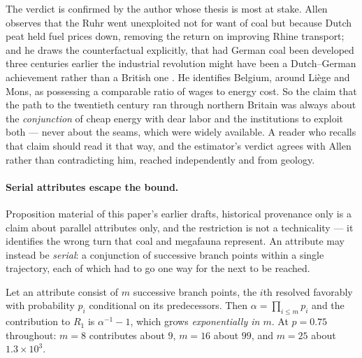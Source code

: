 The verdict is confirmed by the author whose thesis is most at stake.
Allen observes that the Ruhr went unexploited not for want of coal but
because Dutch peat held fuel prices down, removing the return on
improving Rhine transport; and he draws the counterfactual explicitly,
that had German coal been developed three centuries earlier the
industrial revolution might have been a Dutch--German achievement rather
than a British one \cite{Allen09}. He identifies Belgium, around
Li\`ege and Mons, as possessing a comparable ratio of wages to energy
cost. So the claim that the path to the twentieth century ran through
northern Britain was always about the \emph{conjunction} of cheap energy
with dear labor and the institutions to exploit both --- never about
the seams, which were widely available. A reader who recalls that claim
should read it that way, and the estimator's verdict agrees with Allen
rather than contradicting him, reached independently and from geology.


\paragraph{Serial attributes escape the bound.} Proposition
material of this paper's earlier drafts, historical provenance only is a claim about parallel attributes only, and the
restriction is not a technicality --- it identifies the wrong turn that
coal and megafauna represent. An attribute may instead be
\emph{serial}: a conjunction of successive branch points within a single
trajectory, each of which had to go one way for the next to be reached.

\begin{proposition}
\label{gc:prop:cascade}
Let an attribute consist of $m$ successive branch points, the $i$th
resolved favorably with probability $p_i$ conditional on its
predecessors. Then $\alpha=\prod_{i\le m}p_i$ and the contribution to
$R_1$ is $\alpha^{-1}-1$, which grows \emph{exponentially in $m$}. At
$p=0.75$ throughout: $m=8$ contributes about $9$, $m=16$ about $99$,
and $m=25$ about $1.3\times10^{3}$.
\end{proposition}


